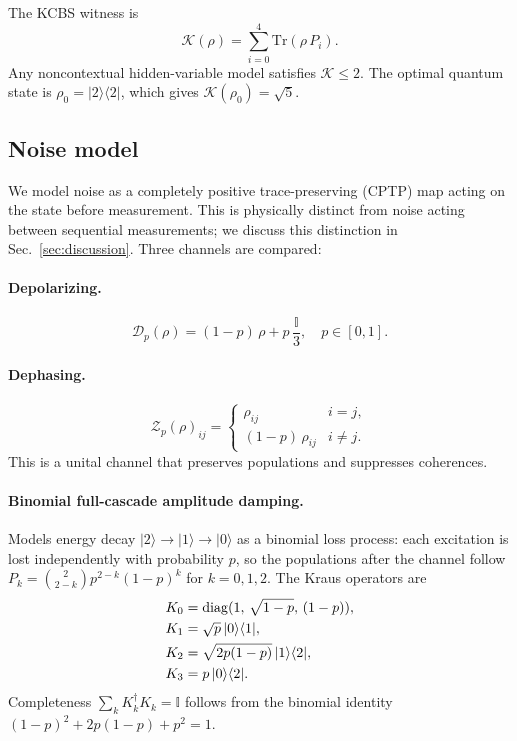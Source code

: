 \documentclass[twocolumn,showpacs,preprintnumbers,amsmath,amssymb,prl]{revtex4-2}
\newcommand{\ket}[1]{|#1\rangle}
\newcommand{\bra}[1]{\langle #1|}
\newcommand{\tr}{\mathrm{Tr}}
\newcommand{\K}{\mathcal{K}}          %
\newcommand{\Id}{\mathbb{I}}          %
\begin{document}
The KCBS witness is
\begin{equation}
  \K(\rho) = \sum_{i=0}^{4} \tr(\rho\, P_i).
  \label{eq:witness}
\end{equation}
Any noncontextual hidden-variable model satisfies $\K \leq 2$.
The optimal quantum state is $\rho_0 = \ket{2}\bra{2}$, which gives
$\K(\rho_0) = \sqrt{5}$.

\subsection{Noise model}

We model noise as a completely positive trace-preserving (CPTP) map acting on
the state before measurement.
This is physically distinct from noise acting between sequential measurements;
we discuss this distinction in Sec.~\ref{sec:discussion}.
Three channels are compared:

\paragraph{Depolarizing.}
\begin{equation}
  \mathcal{D}_p(\rho) = (1-p)\,\rho + p\,\frac{\Id}{3}, \quad p \in [0,1].
  \label{eq:depolarize}
\end{equation}

\paragraph{Dephasing.}
\begin{equation}
  \mathcal{Z}_p(\rho)_{ij} =
  \begin{cases}
    \rho_{ij} & i = j, \\
    (1-p)\,\rho_{ij} & i \neq j.
  \end{cases}
  \label{eq:dephase}
\end{equation}
This is a unital channel that preserves populations and suppresses coherences.

\paragraph{Binomial full-cascade amplitude damping.}
Models energy decay $\ket{2}\to\ket{1}\to\ket{0}$ as a binomial loss process:
each excitation is lost independently with probability $p$, so the populations
after the channel follow $P_k = \binom{2}{2-k}p^{2-k}(1-p)^k$ for $k=0,1,2$.
The Kraus operators are
\begin{align}
  K_0 &= \mathrm{diag}(1,\,\sqrt{1-p},\,(1-p)), \notag \\
  K_1 &= \sqrt{p}\,\ket{0}\bra{1}, \notag \\
  K_2 &= \sqrt{2p(1-p)}\,\ket{1}\bra{2}, \notag \\
  K_3 &= p\,\ket{0}\bra{2}.
  \label{eq:kraus}
\end{align}
Completeness $\sum_k K_k^\dagger K_k = \Id$ follows from the binomial identity
$(1-p)^2 + 2p(1-p) + p^2 = 1$.
\end{document}
